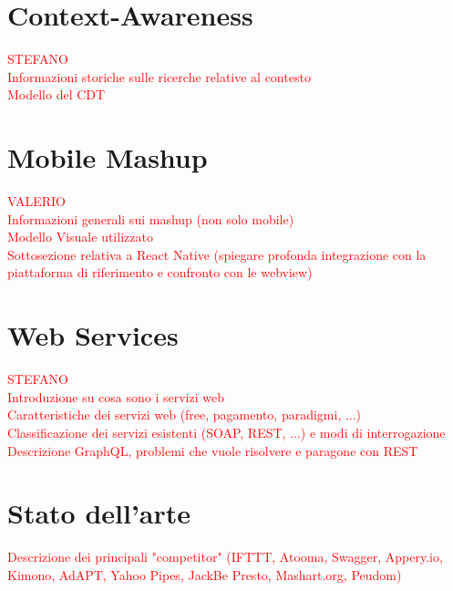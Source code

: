 \section{Context-Awareness\label{sec:context-awareness}}

\textcolor{red}{STEFANO\\Informazioni storiche sulle ricerche relative al contesto\\
Modello del CDT}

\section{Mobile Mashup\label{sec:mobile-mashup}}

\textcolor{red}{VALERIO\\Informazioni generali sui mashup (non solo mobile)\\
Modello Visuale utilizzato\\
Sottosezione relativa a React Native (spiegare profonda integrazione con la piattaforma di riferimento e confronto con le webview)}

\section{Web Services\label{sec:web-services}}

\textcolor{red}{STEFANO\\Introduzione su cosa sono i servizi web\\
Caratteristiche dei servizi web (free, pagamento, paradigmi, ...)\\
Classificazione dei servizi esistenti (SOAP, REST, ...) e modi di interrogazione\\
Descrizione GraphQL, problemi che vuole risolvere e paragone con REST}

\section{Stato dell'arte\label{sec:stato-arte}}

\textcolor{red}{Descrizione dei principali "competitor" (IFTTT, Atooma, Swagger, Appery.io, Kimono, AdAPT, Yahoo Pipes, JackBe Presto, Mashart.org, Peudom)}